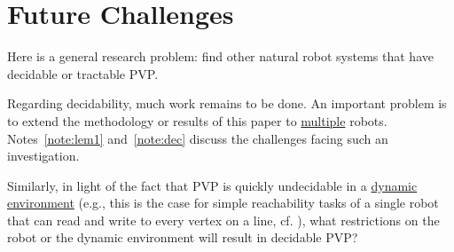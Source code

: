 \documentclass{aamas2015}
\def\RTL{\textsf{RTL}}
\def\fol{\mathsf{FOL}}
\newcommand{\sr}[1]{\footnote{{\color{red} Note. #1}}}
\begin{document}
%
%


\section{Future Challenges} \label{sec:future}


Here is a general research problem: find other natural robot systems that have decidable or tractable PVP.

Regarding decidability, much work remains to be done. An important problem is to extend the methodology or results of this paper to \underline{multiple} robots. Notes~\ref{note:lem1} and~\ref{note:dec} discuss the challenges facing such an investigation.

Similarly, in light of the fact that PVP is quickly undecidable in a \underline{dynamic environment} (e.g., this is the case for simple reachability tasks of a single robot that can read and write to every vertex on a line, cf. \cite{Suzuki,EN95}), what restrictions on the robot or the dynamic environment will result in decidable PVP? 
\end{document}
